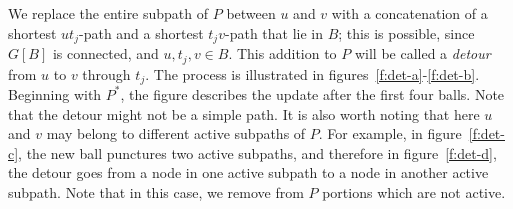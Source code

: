 \documentclass[twoside,leqno,twocolumn]{article}
\begin{document}
We replace the entire subpath of $P$ between $u$ and $v$ with a concatenation of a shortest $ut_j$-path and a shortest $t_jv$-path that lie in $B$; this is possible, since $G[B]$ is connected, and $u,t_j,v \in B$.
This addition to $P$ will be called a {\em detour} from $u$ to $v$ through $t_j$. The process is illustrated in figures~\ref{f:det-a}-\ref{f:det-b}. Beginning with $P^*$, the figure describes the update after the first four balls. Note that the detour might not be a simple path.
It is also worth noting that here $u$ and $v$ may belong to different active subpaths of $P$. For example, in figure~\ref{f:det-c}, the new ball punctures two active subpaths, and therefore in figure~\ref{f:det-d}, the detour goes from a node in one active subpath to a node in another active subpath. Note that in this case, we remove from $P$ portions which are not active.
\end{document}

